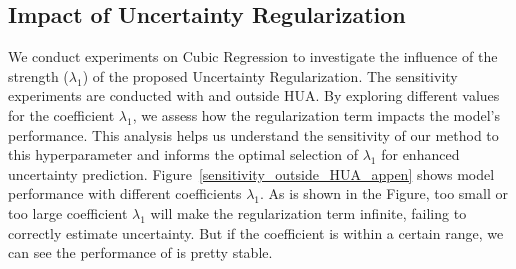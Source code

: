 \subsection{Impact of Uncertainty Regularization}
\label{appendix_23}
We conduct experiments on Cubic Regression to investigate the influence of the strength ($\lambda_{1}$) of the proposed Uncertainty Regularization. The sensitivity experiments are conducted with \ours and outside HUA.
By exploring different values for the coefficient $\lambda_{1}$, we assess how the regularization term impacts the model's performance. This analysis helps us understand the sensitivity of our method to this hyperparameter and informs the optimal selection of $\lambda_{1}$ for enhanced uncertainty prediction. 
Figure~\ref{sensitivity_outside_HUA_appen} shows model performance with different coefficients $\lambda_{1}$. As is shown in the Figure, too small or too large coefficient $\lambda_{1}$ will make the regularization term infinite, failing to correctly estimate uncertainty. But if the coefficient is within a certain range, we can see the performance of \ours is pretty stable.